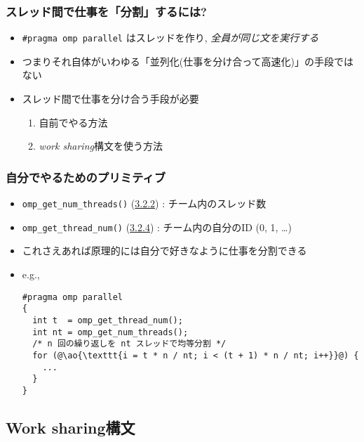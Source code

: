 \documentclass[10pt,dvipdfmx]{beamer}
\newcommand{\sectionompgetnumthreads}{\href{https://www.openmp.org/spec-html/5.1/openmpsu121.html\#x160-1930003.2.2}{3.2.2}}
\newcommand{\sectionompgetmaxthreads}{\href{https://www.openmp.org/spec-html/5.1/openmpsu122.html\#x161-1940003.2.3}{3.2.3}}
\newcommand{\sectionompgetthreadnum}{\href{https://www.openmp.org/spec-html/5.1/openmpsu123.html\#x162-1950003.2.4}{3.2.4}}
\newcommand{\ao}[1]{{\color{blue}#1}}
\newcommand{\aka}[1]{{\color{red}#1}}
\begin{document}
\begin{frame}
\frametitle{スレッド間で仕事を「分割」するには?}
\begin{itemize}
\item {\tt \#pragma omp parallel} はスレッドを作り, 
  \aka{\em 全員が同じ文を実行する}
\item つまりそれ自体がいわゆる「並列化(仕事を分け合って高速化)」の手段ではない
\item スレッド間で仕事を分け合う手段が必要
  \begin{enumerate}
  \item 自前でやる方法
  \item \ao{\em work sharing}構文を使う方法
  \end{enumerate}
\end{itemize}
\end{frame}

\begin{frame}[fragile]
\frametitle{自分でやるためのプリミティブ}

\begin{itemize}
\item \ao{\tt omp\_get\_num\_threads()} 
(\sectionompgetnumthreads) : チーム内のスレッド数
\item \ao{\tt omp\_get\_thread\_num()} 
(\sectionompgetthreadnum) : チーム内の自分のID
  (0, 1, \ldots)

\item これさえあれば原理的には自分で好きなように仕事を分割できる

\item e.g.,
\begin{lstlisting}
#pragma omp parallel
{
  int t  = omp_get_thread_num();
  int nt = omp_get_num_threads();
  /* n 回の繰り返しを nt スレッドで均等分割 */
  for (@\ao{\texttt{i = t * n / nt; i < (t + 1) * n / nt; i++}}@) {
    ...
  }
}
\end{lstlisting}
\end{itemize}
\end{frame}

\subsection{Work sharing構文}
\end{document}
